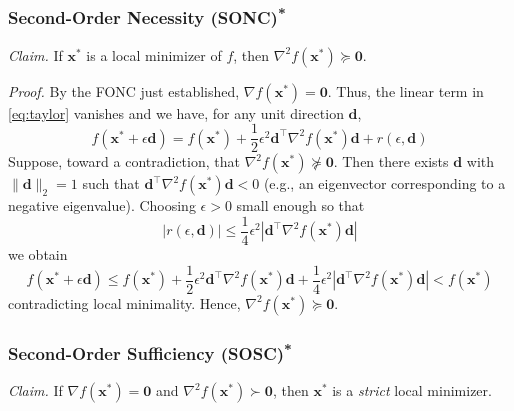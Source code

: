 \subsubsection{\texorpdfstring{Second-Order Necessity (SONC)\textsuperscript{*}}{Second-Order Necessity (SONC)}}
\emph{Claim.} If $\mathbf{x}^*$ is a local minimizer of $f$, then $\nabla^2 f(\mathbf{x}^*) \succeq \mathbf{0}$.

\emph{Proof.}
By the FONC just established, $\nabla f(\mathbf{x}^*)=\mathbf{0}$. Thus, the linear term in \autoref{eq:taylor} vanishes and we have, for any unit direction $\mathbf{d}$,
\begin{equation}
f(\mathbf{x}^* + \epsilon \mathbf{d})
= f(\mathbf{x}^*) + \frac{1}{2}\epsilon^2 \mathbf{d}^\top \nabla^2 f(\mathbf{x}^*) \mathbf{d} + r(\epsilon,\mathbf{d})
\end{equation}
Suppose, toward a contradiction, that $\nabla^2 f(\mathbf{x}^*) \nsucceq \mathbf{0}$. Then there exists $\mathbf{d}$ with $\|\mathbf{d}\|_2=1$ such that 
$\mathbf{d}^\top \nabla^2 f(\mathbf{x}^*) \mathbf{d} < 0$ (e.g., an eigenvector corresponding to a negative eigenvalue). Choosing $\epsilon>0$ small enough so that
\begin{equation}
|r(\epsilon,\mathbf{d})|\le \frac{1}{4}\epsilon^2  \left|\mathbf{d}^\top \nabla^2 f(\mathbf{x}^*) \mathbf{d}\right|
\end{equation} 
we obtain
\begin{equation}
f(\mathbf{x}^* + \epsilon \mathbf{d}) 
\le f(\mathbf{x}^*) + \frac{1}{2}\epsilon^2 \mathbf{d}^\top \nabla^2 f(\mathbf{x}^*) \mathbf{d} 
+ \frac{1}{4}\epsilon^2 \left|\mathbf{d}^\top \nabla^2 f(\mathbf{x}^*) \mathbf{d}\right|
< f(\mathbf{x}^*)
\end{equation}
contradicting local minimality. Hence, $\nabla^2 f(\mathbf{x}^*) \succeq \mathbf{0}$.

\subsubsection{\texorpdfstring{Second-Order Sufficiency (SOSC)\textsuperscript{*}}{Second-Order Sufficiency (SOSC)}}
\emph{Claim.} If $\nabla f(\mathbf{x}^*)=\mathbf{0}$ and $\nabla^2 f(\mathbf{x}^*) \succ \mathbf{0}$, then $\mathbf{x}^*$ is a \emph{strict} local minimizer.

